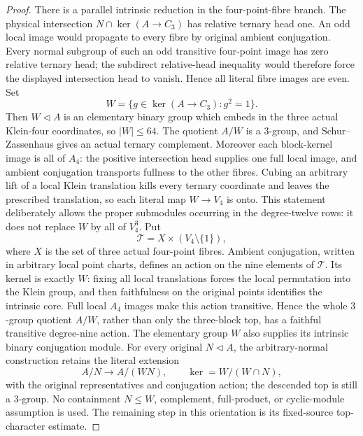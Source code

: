 \begin{proof}
There is a parallel intrinsic reduction in the four-point-fibre branch.
The physical intersection $N\cap\ker(A\to C_3)$ has relative ternary head
one.  An odd local image would propagate to every fibre by original ambient
conjugation.  Every normal subgroup of such an odd transitive four-point
image has zero relative ternary head; the subdirect relative-head inequality
would therefore force the displayed intersection head to vanish.  Hence all
literal fibre images are even.  Set
\[
  W=\{g\in\ker(A\to C_3):g^2=1\}.
\]
Then $W\triangleleft A$ is an elementary binary group which embeds in the
three actual Klein-four coordinates, so $|W|\leq64$.  The quotient $A/W$
is a $3$-group, and Schur--Zassenhaus gives an actual ternary complement.
Moreover each block-kernel image is all of $A_4$: the positive intersection
head supplies one full local image, and ambient conjugation transports
fullness to the other fibres.  Cubing an arbitrary lift of a local Klein
translation kills every ternary coordinate and leaves the prescribed
translation, so each literal map $W\to V_4$ is onto.
This statement deliberately allows the proper submodules occurring in the
degree-twelve rows: it does not replace $W$ by all of $V_4^3$.  Put
\[
 \mathcal T=X\times(V_4\setminus\{1\}),
\]
where $X$ is the set of three actual four-point fibres.  Ambient conjugation,
written in arbitrary local point charts, defines an action on the nine
elements of $\mathcal T$.  Its kernel is exactly $W$: fixing all local
translations forces the local permutation into the Klein group, and then
faithfulness on the original points identifies the intrinsic core.  Full
local $A_4$ images make this action transitive.  Hence the whole $3$-group
quotient $A/W$, rather than only the three-block top, has a faithful
transitive degree-nine action.  The elementary group $W$ also supplies its
intrinsic binary conjugation module.  For every original $N\triangleleft A$,
the arbitrary-normal construction retains the literal extension
\[
 A/N\longrightarrow A/(WN),
 \qquad \ker=W/(W\cap N),
\]
with the original representatives and conjugation action; the descended top
is still a $3$-group.  No containment $N\leq W$, complement, full-product, or
cyclic-module assumption is used.  The remaining step in this orientation is
its fixed-source top-character estimate.


\end{proof}
